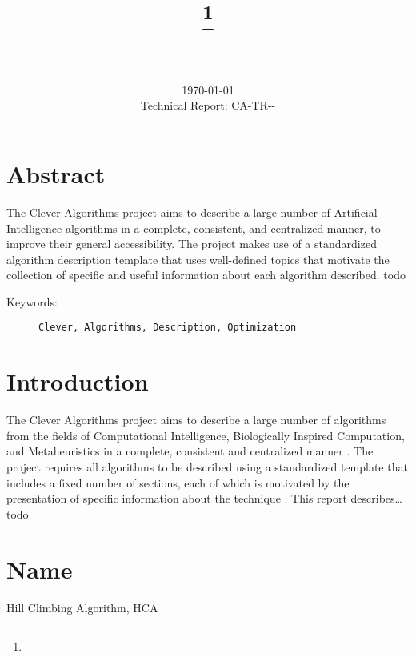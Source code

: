 \documentclass[a4paper, 11pt]{article}
\title{{\myreporttitle}\footnote{\myreportlicense}}
\author{\myreportauthor\\{\myreportemail}\\\small\myreportproject}
\date{\today\\{\small{Technical Report: CA-TR-{\myreportdate}-\myreportversion}}}
\begin{document}
\maketitle

\section*{Abstract} 
The Clever Algorithms project aims to describe a large number of Artificial Intelligence algorithms in a complete, consistent, and centralized manner, to improve their general accessibility. 
The project makes use of a standardized algorithm description template that uses well-defined topics that motivate the collection of specific and useful information about each algorithm described.
todo

\begin{description}
	\item[Keywords:] {\small\texttt{Clever, Algorithms, Description, Optimization}}
\end{description} 

\section{Introduction} 
\label{sec:intro}
The Clever Algorithms project aims to describe a large number of algorithms from the fields of Computational Intelligence, Biologically Inspired Computation, and Metaheuristics in a complete, consistent and centralized manner \cite{Brownlee2010}.
The project requires all algorithms to be described using a standardized template that includes a fixed number of sections, each of which is motivated by the presentation of specific information about the technique \cite{Brownlee2010a}.
This report describes\ldots todo

\section{Name} 
\label{sec:name}
Hill Climbing Algorithm, HCA
\end{document}
